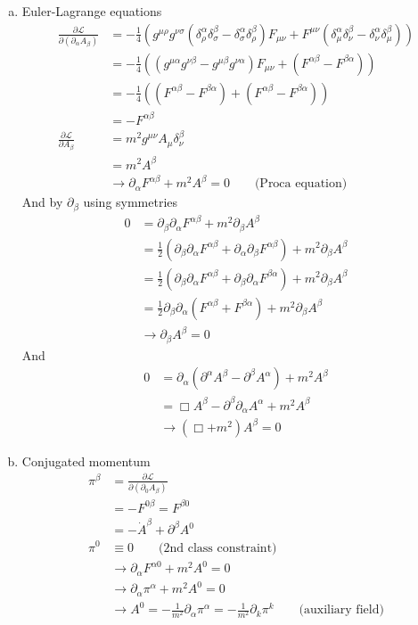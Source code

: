 \documentclass[10pt,a4paper]{report}
\theoremstyle{definition}
\begin{document}
\begin{enumerate}[a)]
\item Euler-Lagrange equations
\begin{align}
\frac{\partial\mathcal{L}}{\partial(\partial_\alpha A_\beta)}
&=-\frac{1}{4}\left(g^{\mu\rho}g^{\nu\sigma}(\delta^\alpha_\rho\delta^\beta_\sigma-\delta^\alpha_\sigma\delta^\beta_\rho)F_{\mu\nu}+F^{\mu\nu}(\delta^\alpha_\mu\delta^\beta_\nu-\delta^\alpha_\nu\delta^\beta_\mu)\right)\\
&=-\frac{1}{4}\left((g^{\mu\alpha}g^{\nu\beta}-g^{\mu\beta}g^{\nu\alpha})F_{\mu\nu}+(F^{\alpha\beta}-F^{\beta\alpha})\right)\\
&=-\frac{1}{4}\left((F^{\alpha\beta}-F^{\beta\alpha})+(F^{\alpha\beta}-F^{\beta\alpha})\right)\\
&=-F^{\alpha\beta}\\
\frac{\partial\mathcal{L}}{\partial A_\beta}
&=m^2g^{\mu\nu}A_\mu\delta_\nu^\beta\\
&=m^2A^\beta\\
&\rightarrow\partial_\alpha F^{\alpha\beta}+m^2A^\beta=0\qquad\text{(Proca equation)}
\end{align}
And by $\partial_\beta$ using symmetries 
\begin{align}
0&=\partial_\beta\partial_\alpha F^{\alpha\beta}+m^2\partial_\beta A^\beta\\
&=\frac{1}{2}(\partial_\beta\partial_\alpha F^{\alpha\beta}+\partial_\alpha\partial_\beta F^{\alpha\beta})+m^2\partial_\beta A^\beta\\
&=\frac{1}{2}(\partial_\beta\partial_\alpha F^{\alpha\beta}+\partial_\beta\partial_\alpha F^{\beta\alpha})+m^2\partial_\beta A^\beta\\
&=\frac{1}{2}\partial_\beta\partial_\alpha(F^{\alpha\beta}+ F^{\beta\alpha})+m^2\partial_\beta A^\beta\\
&\rightarrow\partial_\beta A^\beta=0
\end{align}
And
\begin{align}
0
&=\partial_\alpha(\partial^\alpha A^\beta-\partial^\beta A^\alpha)+m^2A^\beta\\
&=\Box A^\beta-\partial^\beta \partial_\alpha A^\alpha+m^2A^\beta\\
&\rightarrow(\Box +m^2)A^\beta=0
\end{align}

\item Conjugated momentum
\begin{align}
\pi^\beta
&=\frac{\partial\mathcal{L}}{\partial(\partial_0 A_\beta)}\\
&=-F^{0\beta}=F^{\beta0}\\
&=-\dot{A}^\beta+\partial^\beta A^0\\
\pi^0&\equiv0\qquad\text{(2nd class constraint)}\\
&\rightarrow\partial_\alpha F^{\alpha 0}+m^2A^0=0\\
&\rightarrow\partial_\alpha \pi^\alpha+m^2A^0=0\\
&\rightarrow A^0=-\frac{1}{m^2}\partial_\alpha \pi^\alpha=-\frac{1}{m^2}\partial_k \pi^k\qquad\text{(auxiliary field)}
\end{align}


\end{enumerate}
\end{document}
